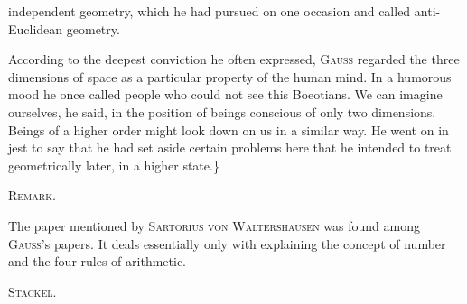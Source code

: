 %
independent geometry, which he had pursued on one occasion and called anti-Euclidean geometry.

According to the deepest conviction he often expressed, \textsc{Gauss} regarded the three dimensions of space as a particular property of the human mind. In a humorous mood he once called people who could not see this Boeotians. We can imagine ourselves, he said, in the position of beings conscious of only two dimensions. Beings of a higher order might look down on us in a similar way. He went on in jest to say that he had set aside certain problems here that he intended to treat geometrically later, in a higher state.\}

\begin{center}\textsc{Remark.}\end{center}

The paper mentioned by \textsc{Sartorius von Waltershausen} was found among \textsc{Gauss}’s papers. It deals essentially only with explaining the concept of number and the four rules of arithmetic.

\hfill \textsc{Stäckel}.
